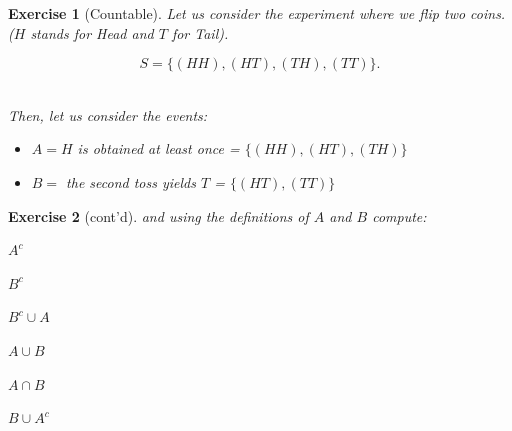 \documentclass[notes=show]{beamer}\usepackage[]{graphicx}\usepackage[]{color}
\newtheorem{exercise}{Exercise}[section]
\begin{document}
\begin{frame}{\secname}
  \begin{exercise}[Countable]

  Let us consider the  experiment where we flip two coins. ($H$ stands for Head and $T$ for Tail).

  \vspace{0.5cm}
  $$ S = \Big\{ (HH),(HT),(TH),(TT)  \Big\}.$$ \\


  \vspace{0.5cm}

  Then, let us consider the events:
  \begin{itemize}
  \item $A= H$ is obtained at least once = $\Big\{ (HH),(HT),(TH) \Big\}$
  \item $B=$ the second toss yields $T$ =  $\Big\{ (HT),(TT) \Big\}$
  \end{itemize}
  \end{exercise}
\end{frame}


\begin{frame}{\secname}
  \begin{exercise}[cont'd]
  and using the definitions of $A$ and $B$ compute:
  \begin{itemize}
  \begin{multicols}{2}
  \item $A^c $
  \item $B^c$
  \item $B^c \cup A$

  \item $A \cup B$
  \item $A \cap B$
  \item $B \cup A^c$
  \end{multicols}
  \end{itemize}
  \end{exercise}
\end{frame}
\end{document}
